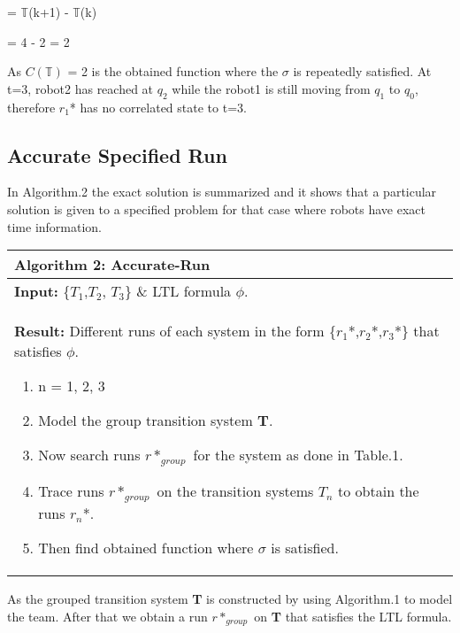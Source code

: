 \hspace{30pt}  = $\mathbb{T}$(k+1) - $\mathbb{T}$(k)

\hspace{30pt}  = 4 - 2 = 2

 As $C(\mathbb{T})$ = 2 is the obtained function where the $\sigma$ is repeatedly satisfied. At t=3, robot2 has reached at $q_2$ while the robot1 is still moving from $q_1$ to $q_0$, therefore $r_1$* has no correlated state to t=3.

 \subsection{Accurate Specified Run}
 In Algorithm.2 the exact solution is summarized and it shows that a particular solution is given to a specified problem for that case where robots have exact time information.

\begin{center}
\begin{tabular}{ |p{12cm}| }
 \hline
 \textbf{Algorithm 2:} Accurate-Run \\ \hline
\textbf{ Input:} \{$T_1$,$T_2$, $T_3$\} \& LTL formula $\phi$. \\
  \textbf{Result:} Different runs of each system in the form \{$r_1$*,$r_2$*,$r_3$*\} that satisfies $\phi$.
  \begin{enumerate}
    \item n = 1, 2, 3
    \item Model the group transition system \textbf{T}.
    \item Now search runs $r*_{group}$ for the system as done in Table.1.
    \item Trace runs $r*_{group}$ on the transition systems $T_n$ to obtain the runs $r_n$*.
    \item Then find obtained function where $\sigma$ is satisfied.
  \end{enumerate}
 \\
 \hline
\end{tabular}
\end{center}

As the grouped transition system \textbf{T} is constructed by using Algorithm.1 to model the team. After that we obtain a run $r*_{group}$ on \textbf{T} that satisfies the LTL formula.

